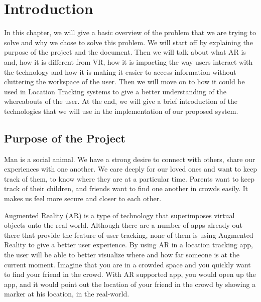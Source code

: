 \chapter{ Introduction} 
\label{chap1}

In this chapter, we will give a basic overview of the problem that we are trying to solve and why we chose to solve this problem. We will start off by explaining the purpose of the project and the document. Then we will talk about what AR is and, how it is different from VR, how it is impacting the way users interact with the technology and how it is making it easier to access information without cluttering the workspace of the user. Then we will move on to how it could be used in Location Tracking systems to give a better understanding of the whereabouts of the user. At the end, we will give a brief introduction of the technologies that we will use in the implementation of our proposed system.


\section{Purpose of the Project}
Man is a social animal. We have a strong desire to connect with others, share our experiences with one another. We care deeply for our loved ones and want to keep track of them, to know where they are at a particular time. Parents want to keep track of their children, and friends want to find one another in crowds easily. It makes us feel more secure and closer to each other.

Augmented Reality (AR) is a type of technology that superimposes virtual objects onto the real world. Although there are a number of apps already out there that provide the feature of user tracking, none of them is using Augmented Reality to give a better user experience. By using AR in a location tracking app, the user will be able to better visualize where and how far someone is at the current moment. Imagine that you are in a crowded space and you quickly want to find your friend in the crowd. With AR supported app, you would open up the app, and it would point out the location of your friend in the crowd by showing a marker at his location, in the real-world.

